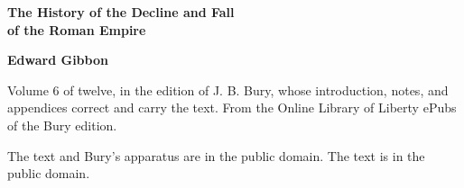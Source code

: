 \documentclass[11pt,letterpaper]{article}
\begin{document}
\color{ink}

\begin{titlepage}
\centering
\vspace*{4em}
{\LARGE\bfseries\color{heading} The History of the Decline and Fall\\[0.3em]of the Roman Empire\par}
\vspace{2em}
{\Large\bfseries\color{heading} Edward Gibbon\par}
\vspace{2.5em}
{\itshape\color{subhead}\parbox{0.8\linewidth}{\centering Volume 6 of twelve, in the edition of J. B. Bury, whose introduction, notes, and appendices correct and carry the text. From the Online Library of Liberty ePubs of the Bury edition.\par}}
\vfill
{\small The text and Bury's apparatus are in the public domain. The text is in the public domain.\par}
\vspace{2em}
\end{titlepage}

\tableofcontents


\end{document}
